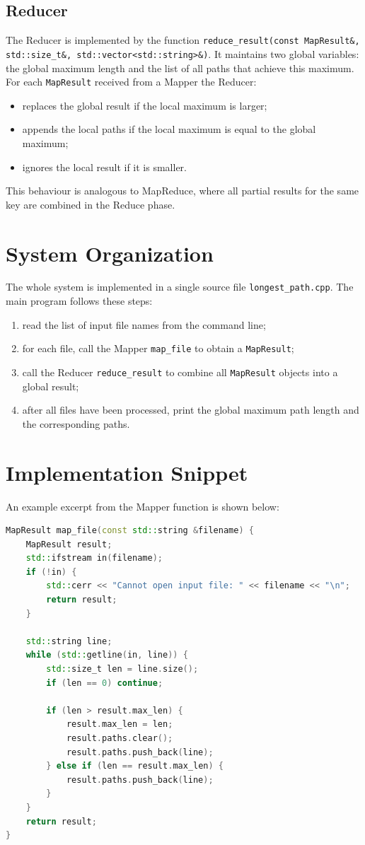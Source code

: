 \documentclass[a4paper,11pt]{article}
\begin{document}
\subsection*{Reducer}
The Reducer is implemented by the function
\texttt{reduce\_result(const MapResult\&, std::size\_t\&, std::vector<std::string>\&)}.
It maintains two global variables: the global maximum length and the
list of all paths that achieve this maximum. For each \texttt{MapResult}
received from a Mapper the Reducer:
\begin{itemize}
  \item replaces the global result if the local maximum is larger;
  \item appends the local paths if the local maximum is equal to the
        global maximum;
  \item ignores the local result if it is smaller.
\end{itemize}
This behaviour is analogous to MapReduce, where all partial results
for the same key are combined in the Reduce phase.

\section{System Organization}
The whole system is implemented in a single source file
\texttt{longest\_path.cpp}. The main program follows these steps:
\begin{enumerate}
  \item read the list of input file names from the command line;
  \item for each file, call the Mapper \texttt{map\_file} to obtain a
  \texttt{MapResult};
  \item call the Reducer \texttt{reduce\_result} to combine all
  \texttt{MapResult} objects into a global result;
  \item after all files have been processed, print the global maximum
  path length and the corresponding paths.
\end{enumerate}

\section{Implementation Snippet}
An example excerpt from the Mapper function is shown below:

\begin{lstlisting}[language=C++]
MapResult map_file(const std::string &filename) {
    MapResult result;
    std::ifstream in(filename);
    if (!in) {
        std::cerr << "Cannot open input file: " << filename << "\n";
        return result;
    }

    std::string line;
    while (std::getline(in, line)) {
        std::size_t len = line.size();
        if (len == 0) continue;

        if (len > result.max_len) {
            result.max_len = len;
            result.paths.clear();
            result.paths.push_back(line);
        } else if (len == result.max_len) {
            result.paths.push_back(line);
        }
    }
    return result;
}
\end{lstlisting}
\end{document}
